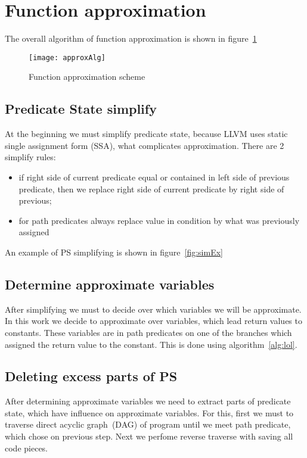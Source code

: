 \section{Function approximation}\label{sec:mining}

The overall algorithm of function approximation is shown in figure~\ref{fig:approxAlg}
\begin{figure}[H]
\centering
\caption{Function approximation scheme}
\label{fig:approxAlg}
\texttt{[image: approxAlg]}
\end{figure}


\subsection{Predicate State simplify}
At the beginning we must simplify predicate state, because LLVM uses static single assignment form (SSA), what complicates approximation. There are 2 simplify rules:
\begin{itemize}
\item if right side of current predicate equal or contained in left side of previous predicate, then we replace right side of current predicate by right side of previous;
\item for path predicates always replace value in condition by what was previously assigned
\end{itemize} 
An example of PS simplifying is shown in figure~\ref{fig:simEx}


\subsection{Determine approximate variables}
After simplifying we must to decide over which variables we will be approximate. In this work we decide to approximate over variables, which lead return values to constants. These variables are in path predicates on one of the branches which assigned the return value to the constant. This is done using algorithm~\ref{alg:lol}.

\subsection{Deleting excess parts of PS}
After determining approximate variables we need to extract parts of predicate state, which have influence on approximate variables. For this, first we must to traverse direct acyclic graph~(DAG) of program until we meet path predicate, which chose on previous step. Next we perfome reverse traverse with saving all code pieces.


